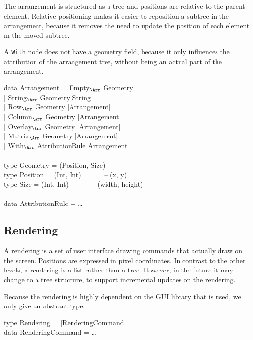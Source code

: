 The arrangement is structured as a tree and positions are relative to the parent element. Relative positioning makes it easier to reposition a subtree in the arrangement, because it removes the need to update the position of each element in the moved subtree. 

A \verb|With| node does not have a geometry field, because it only influences the attribution of the arrangement tree, without being an actual part of the arrangement. 
\ttfamily
\begin{tabbing}
data Arrangement \= = Empty$_{\Arr}$ Geometry\\
                 \> | String$_{\Arr}$ Geometry String\\
                 \> | Row$_{\Arr}$ Geometry [Arrangement]\\
                 \> | Column$_{\Arr}$ Geometry [Arrangement]\\
                 \> | Overlay$_{\Arr}$ Geometry [Arrangement]\\
                 \> | Matrix$_{\Arr}$ Geometry [Arrangement]\\
                 \> | With$_{\Arr}$ AttributionRule Arrangement\\
\\
type Geometry = (Position, Size)\\
type Position \= = (Int, Int)  ~~~~~~-- (x,  y)\\
type Size      \> = (Int, Int)  ~~~~~~-- (width, height)\\
\\
data AttributionRule = \dots\\
\end{tabbing}
\rmfamily

%																
\subsection{Rendering}

A rendering is a set of user interface drawing commands that actually draw on the screen. Positions are expressed in pixel coordinates. In contrast to the other levels, a rendering is a list rather than a tree. However, in the future it may change to a tree structure, to support incremental updates on the rendering. 

Because the rendering is highly dependent on the GUI library that is used, we only give an abstract type.

\noindent
\ttfamily
\begin{tabbing}
type Rendering = [RenderingCommand]\\
data RenderingCommand = \dots
\end{tabbing}
\rmfamily




